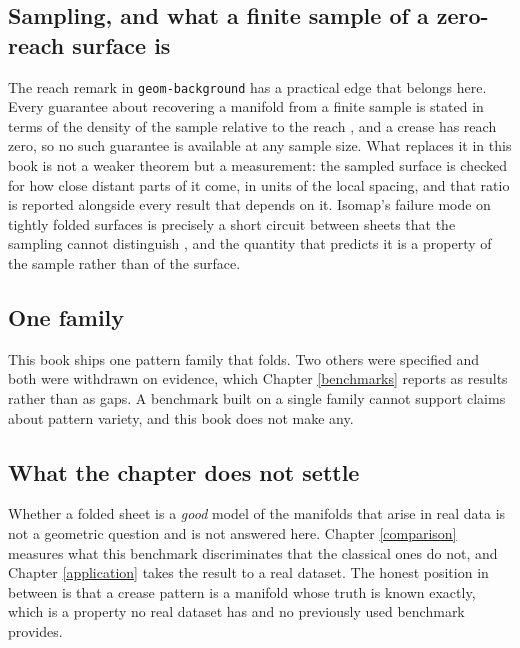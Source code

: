\documentclass[
  british,
  a4paper,
]{book}
\begin{document}
\subsection{Sampling, and what a finite sample of a zero-reach surface is}\label{sampling-and-what-a-finite-sample-of-a-zero-reach-surface-is}

The reach remark in \texttt{geom-background} has a practical edge that belongs here.
Every guarantee about recovering a manifold from a finite sample is stated in
terms of the density of the sample relative to the reach \citep{niyogi2008homology},
and a crease has reach zero, so no such guarantee is available at any sample
size. What replaces it in this book is not a weaker theorem but a measurement:
the sampled surface is checked for how close distant parts of it come, in units
of the local spacing, and that ratio is reported alongside every result that
depends on it. Isomap's failure mode on tightly folded surfaces is precisely a
short circuit between sheets that the sampling cannot distinguish
\citep{tenenbaum2000isomap, balasubramanian2002isomap}, and the quantity that
predicts it is a property of the sample rather than of the surface.

\subsection{One family}\label{one-family}

This book ships one pattern family that folds. Two others were specified and
both were withdrawn on evidence, which Chapter \ref{benchmarks} reports as
results rather than as gaps. A benchmark built on a single family cannot support
claims about pattern variety, and this book does not make any.

\subsection{What the chapter does not settle}\label{what-the-chapter-does-not-settle}

Whether a folded sheet is a \emph{good} model of the manifolds that arise in real
data is not a geometric question and is not answered here. Chapter
\ref{comparison} measures what this benchmark discriminates that the classical
ones do not, and Chapter \ref{application} takes the result to a real dataset.
The honest position in between is that a crease pattern is a manifold whose
truth is known exactly, which is a property no real dataset has and no
previously used benchmark provides.
\end{document}
